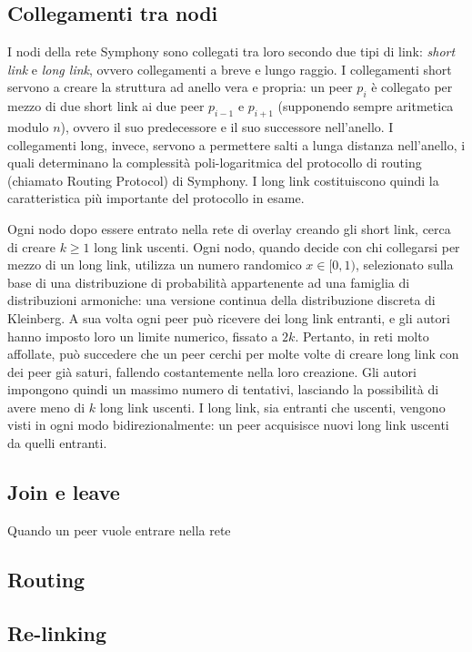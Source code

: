 \documentclass[prodmode,acmtap]{acmlarge}
\begin{document}
\subsection{Collegamenti tra nodi}
I nodi della rete Symphony sono collegati tra loro secondo due tipi di link: \emph{short link} e \emph{long link}, ovvero collegamenti a breve e lungo raggio. I collegamenti short servono a creare la struttura ad anello vera e propria: un peer $p_i$ è collegato per mezzo di due short link ai due peer $p_{i-1}$ e $p_{i+1}$ (supponendo sempre aritmetica modulo $n$), ovvero il suo predecessore e il suo successore nell'anello. I collegamenti long, invece, servono a permettere salti a lunga distanza nell'anello, i quali determinano la complessità poli-logaritmica del protocollo di routing (chiamato Routing Protocol) di Symphony. I long link costituiscono quindi la caratteristica più importante del protocollo in esame.

Ogni nodo dopo essere entrato nella rete di overlay creando gli short link, cerca di creare $k \ge 1$ long link uscenti. Ogni nodo, quando decide con chi collegarsi per mezzo di un long link, utilizza un numero randomico $x \in [0,1)$, selezionato sulla base di una distribuzione di probabilità appartenente ad una famiglia di distribuzioni armoniche: una versione continua della distribuzione discreta di Kleinberg. A sua volta ogni peer può ricevere dei long link entranti, e gli autori hanno imposto loro un limite numerico, fissato a $2k$. Pertanto, in reti molto affollate, può succedere che un peer cerchi per molte volte di creare long link con dei peer già saturi, fallendo costantemente nella loro creazione. Gli autori impongono quindi un massimo numero di tentativi, lasciando la possibilità di avere meno di $k$ long link uscenti. I long link, sia entranti che uscenti, vengono visti in ogni modo bidirezionalmente: un peer acquisisce nuovi long link uscenti da quelli entranti.


\subsection{Join e leave}
Quando un peer vuole entrare nella rete

\subsection{Routing}

\subsection{Re-linking}
\end{document}
